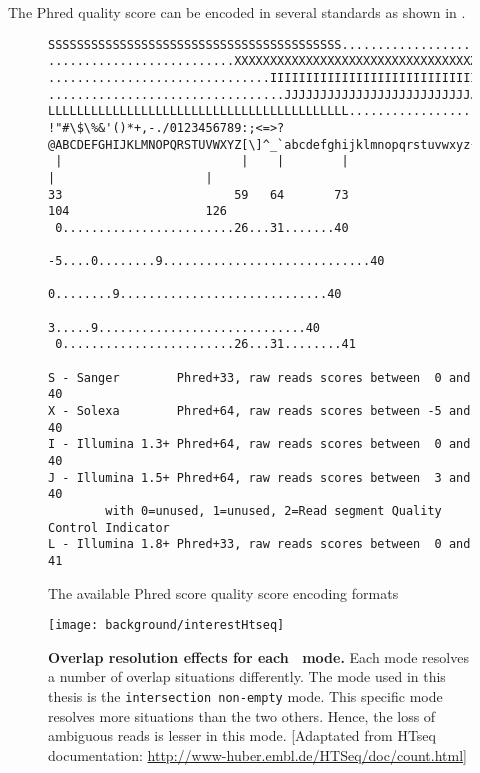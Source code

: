 The \gls{Phred} quality score can be encoded in several standards as shown in .
\begin{figure}[htbp]
\begin{minipage}[adjusting]{\textwidth}
\begin{verbatim}
SSSSSSSSSSSSSSSSSSSSSSSSSSSSSSSSSSSSSSSSS.....................................................
..........................XXXXXXXXXXXXXXXXXXXXXXXXXXXXXXXXXXXXXXXXXXXXXX......................
...............................IIIIIIIIIIIIIIIIIIIIIIIIIIIIIIIIIIIIIIIII......................
.................................JJJJJJJJJJJJJJJJJJJJJJJJJJJJJJJJJJJJJJJ......................
LLLLLLLLLLLLLLLLLLLLLLLLLLLLLLLLLLLLLLLLLL....................................................
!"#\$\%&'()*+,-./0123456789:;<=>?@ABCDEFGHIJKLMNOPQRSTUVWXYZ[\]^_`abcdefghijklmnopqrstuvwxyz{|}~
 |                         |    |        |                              |                     |
33                        59   64       73                            104                   126
 0........................26...31.......40
                          -5....0........9.............................40
                                0........9.............................40
                                   3.....9.............................40
 0........................26...31........41

S - Sanger        Phred+33, raw reads scores between  0 and 40
X - Solexa        Phred+64, raw reads scores between -5 and 40
I - Illumina 1.3+ Phred+64, raw reads scores between  0 and 40
J - Illumina 1.5+ Phred+64, raw reads scores between  3 and 40
        with 0=unused, 1=unused, 2=Read segment Quality Control Indicator
L - Illumina 1.8+ Phred+33, raw reads scores between  0 and 41
\end{verbatim}
\end{minipage}
\caption{The available Phred score quality score encoding formats}\label{phredformat}
\end{figure}

\begin{figure}[!htbp]
    \texttt{[image: background/interestHtseq]}\centering
    \caption[Overlap resolution effects for each \htseq\
    mode]{\label{fig:htseqMode}\textbf{Overlap resolution effects for each \htseq\
    mode.} Each mode resolves a number of overlap situations differently. The
    mode used in this thesis is the \texttt{intersection non-empty} mode. This
    specific mode resolves more situations than the two others. Hence, the loss
    of ambiguous reads is lesser in this mode. [Adaptated from HTseq
    documentation: \footnotesize{\href{http://www-huber.embl.de/HTSeq/doc/count.html}%
    {http://www-huber.embl.de/HTSeq/doc/count.html}}]}
\end{figure}


